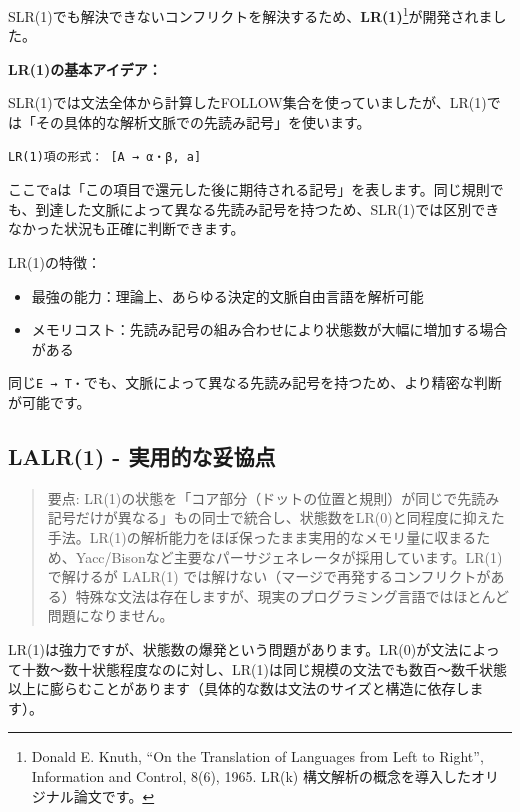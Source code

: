 SLR(1)でも解決できないコンフリクトを解決するため、\textbf{LR(1)}\footnote{Donald
  E. Knuth, ``On the Translation of Languages from Left to Right'',
  Information and Control, 8(6), 1965. LR(k)
  構文解析の概念を導入したオリジナル論文です。}が開発されました。

\textbf{LR(1)の基本アイデア：}

SLR(1)では文法全体から計算したFOLLOW集合を使っていましたが、LR(1)では「その具体的な解析文脈での先読み記号」を使います。

\begin{verbatim}
LR(1)項の形式： [A → α・β, a]
\end{verbatim}

ここで\texttt{a}は「この項目で還元した後に期待される記号」を表します。同じ規則でも、到達した文脈によって異なる先読み記号を持つため、SLR(1)では区別できなかった状況も正確に判断できます。

LR(1)の特徴：

\begin{itemize}
\tightlist
\item
  最強の能力：理論上、あらゆる決定的文脈自由言語を解析可能
\item
  メモリコスト：先読み記号の組み合わせにより状態数が大幅に増加する場合がある
\end{itemize}

同じ\texttt{E\ →\ T・}でも、文脈によって異なる先読み記号を持つため、より精密な判断が可能です。

\hypertarget{chapter5-lalr1---ux5b9fux7528ux7684ux306aux59a5ux5354ux70b9}{%
\subsection{LALR(1) -
実用的な妥協点}\label{chapter5-lalr1---ux5b9fux7528ux7684ux306aux59a5ux5354ux70b9}}

\begin{quote}
要点:
LR(1)の状態を「コア部分（ドットの位置と規則）が同じで先読み記号だけが異なる」もの同士で統合し、状態数をLR(0)と同程度に抑えた手法。LR(1)の解析能力をほぼ保ったまま実用的なメモリ量に収まるため、Yacc/Bisonなど主要なパーサジェネレータが採用しています。LR(1)で解けるが
LALR(1)
では解けない（マージで再発するコンフリクトがある）特殊な文法は存在しますが、現実のプログラミング言語ではほとんど問題になりません。
\end{quote}

LR(1)は強力ですが、状態数の爆発という問題があります。LR(0)が文法によって十数〜数十状態程度なのに対し、LR(1)は同じ規模の文法でも数百〜数千状態以上に膨らむことがあります（具体的な数は文法のサイズと構造に依存します）。

